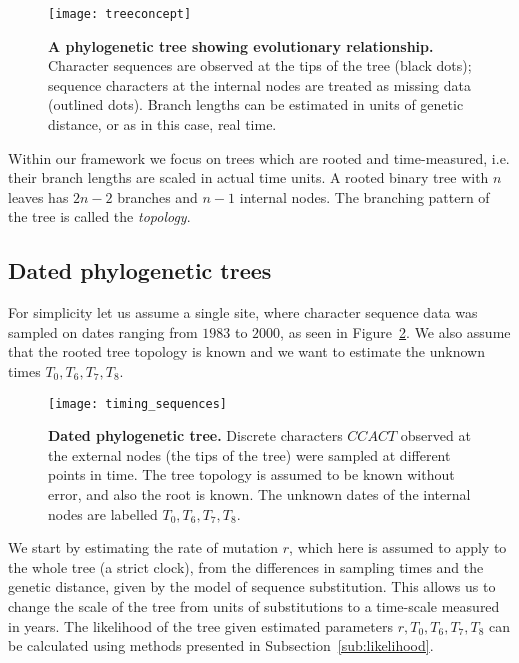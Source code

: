 \begin{figure}[h!]
\centering
\texttt{[image: treeconcept]} 
\caption{
{ \footnotesize 
{\bf A phylogenetic tree showing evolutionary relationship.} Character sequences are observed at the tips of the tree (black dots); sequence characters at the internal nodes are treated as missing data (outlined dots). 
Branch lengths can be estimated in units of genetic distance, or as in this case, real time.
} %
}
\label{fig:treeconcept}
\end{figure}

Within our framework we focus on trees which are rooted and time-measured, i.e. their branch lengths are scaled in actual time units.
A rooted binary tree with $n$ leaves has $2n-2$ branches and $n-1$ internal nodes.
The branching pattern of the tree is called the \emph{topology}. 

\subsection{Dated phylogenetic trees\label{sub:dated_trees}}

For simplicity let us assume a single site, where character sequence data was sampled on dates ranging from $1983$ to $2000$, as seen in Figure~\ref{fig:timing_sequences}.
We also assume that the rooted tree topology is known and we want to estimate the unknown times $T_{0},T_{6},T_{7},T_{8}$.

\begin{figure}[h!]
\centering
\texttt{[image: timing\_sequences]} 
\caption{
{ \footnotesize 
{\bf Dated phylogenetic tree.} 
Discrete characters $CCACT$ observed at the external nodes (the tips of the tree) were sampled at different points in time.
The tree topology is assumed to be known without error, and also the root is known.
The unknown dates of the internal nodes are labelled $T_{0},T_{6},T_{7},T_{8}$.
}%
}
\label{fig:timing_sequences}
\end{figure}

We start by estimating the rate of mutation $r$, which here is assumed to apply to the whole tree (a strict clock), from the differences in sampling times and the genetic distance, given by the model of sequence substitution.
This allows us to change the scale of the tree from units of substitutions to a time-scale measured in years.
The likelihood of the tree given estimated parameters $r,T_{0},T_{6},T_{7},T_{8}$ can be calculated using methods presented in Subsection~\ref{sub:likelihood}.


